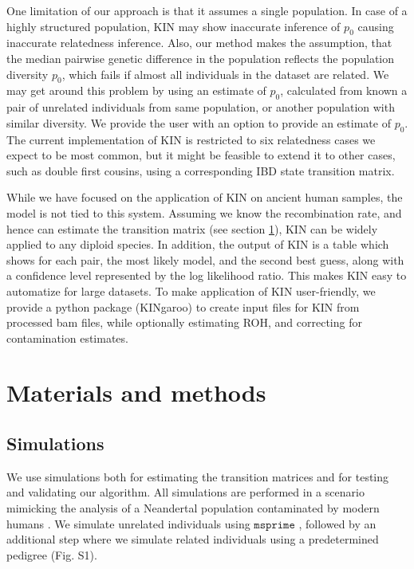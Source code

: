 \documentclass[12pt, letterpaper]{article}
\begin{document}
One limitation of our approach is that it assumes a single population. In case of a highly structured population, KIN may show inaccurate inference of $p_0$ causing inaccurate relatedness inference. Also, our method makes the assumption, that the median pairwise genetic difference in the population reflects the population diversity $p_0$, which fails if almost all individuals in the dataset are related. We may get around this problem by using an estimate of $p_0$, calculated from known a pair of unrelated individuals from same population, or another population with similar diversity. We provide the user with an option to provide an estimate of $p_0$. The current implementation of KIN is restricted to six relatedness cases we expect to be most common, but it might be feasible to extend it to other cases, such as double first cousins, using a corresponding IBD state transition matrix.

While we have focused on the application of KIN on ancient human samples, the model is not tied to this system. Assuming we know the recombination rate, and hence can estimate the transition matrix (see section \ref{method}), KIN can be widely applied to any diploid species. In addition, the output of KIN is a table which shows for each pair, the most likely model, and the second best guess, along with a confidence level represented by the log likelihood ratio. This makes KIN easy to automatize for large datasets. To make application of KIN user-friendly, we provide a python package (KINgaroo) to create input files for KIN from processed bam files, while optionally estimating ROH, and correcting for contamination estimates.


\section{Materials and methods}\label{method}

\subsection{Simulations}\label{simulat}
We use simulations both for estimating the transition matrices and for testing and validating our algorithm. All simulations are performed in a scenario mimicking the analysis of a Neandertal population contaminated by modern humans \cite{mafessoni_high-coverage_2020}. We simulate unrelated individuals using $\texttt{msprime}$ \cite{kelleher_efficient_2016}, followed by an additional step where we simulate related individuals using a predetermined pedigree (Fig. S1).
\end{document}
